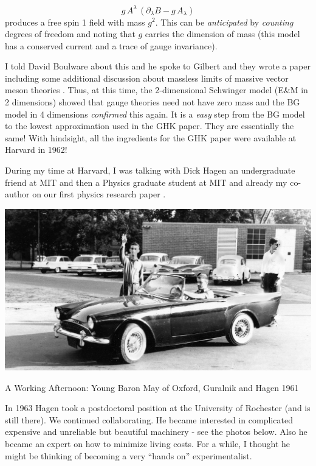 \documentclass[preprintnumbers,12pt]{revtex4-2}
\newcommand{\pa}{\partial}
\begin{document}
\begin{equation*}
  g\, A^{\lambda}\, \left(\pa_{\lambda}B - g\,A_{\lambda}\right)
\end{equation*}
produces a free spin 1 field with mass $g^2$. This can be
\emph{anticipated} by \emph{counting} degrees of freedom and noting
that $g$ carries the dimension of mass (this model has a conserved
current and a trace of gauge invariance).

I told David Boulware about this and he spoke to Gilbert and they
wrote a paper including some additional discussion about massless limits of massive vector
meson theories \cite{bg;1962}. Thus, at this time,
the 2-dimensional Schwinger model (E\&M in 2 dimensions) showed that
gauge theories need not have zero mass and the BG model in 4
dimensions \emph{confirmed} this again. It is a \emph{easy} step from
the BG model to the lowest approximation used in the GHK paper. They
are essentially the same! With hindsight, all the ingredients for the
GHK paper were available at Harvard in 1962!

During my time at Harvard, I was talking with Dick Hagen an
undergraduate friend at MIT and then a Physics graduate student at MIT
and already my co-author on our first physics research paper \cite{gh1;1963}.

\begin{center}
  \includegraphics[scale=0.27]{bgh.jpg}

  A Working Afternoon: Young Baron May of Oxford, Guralnik and Hagen 1961
\end{center}

In 1963 Hagen took a postdoctoral position at the University of
Rochester (and is still there). We continued collaborating. He became
interested in complicated expensive and unreliable but beautiful
machinery - see the photos below. Also he became an expert on how to minimize living costs. For a while, I thought he might be
thinking of becoming a very ``hands on'' experimentalist.
\end{document}
